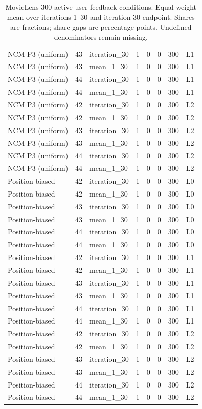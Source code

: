 \begin{table}[htbp!]
\begin{tabular}{lrlrrrrl}
NCM P3 (uniform) & 43 & iteration\_30 & 1 & 0 & 0 & 300 & L1 \\
NCM P3 (uniform) & 43 & mean\_1\_30 & 1 & 0 & 0 & 300 & L1 \\
NCM P3 (uniform) & 44 & iteration\_30 & 1 & 0 & 0 & 300 & L1 \\
NCM P3 (uniform) & 44 & mean\_1\_30 & 1 & 0 & 0 & 300 & L1 \\
NCM P3 (uniform) & 42 & iteration\_30 & 1 & 0 & 0 & 300 & L2 \\
NCM P3 (uniform) & 42 & mean\_1\_30 & 1 & 0 & 0 & 300 & L2 \\
NCM P3 (uniform) & 43 & iteration\_30 & 1 & 0 & 0 & 300 & L2 \\
NCM P3 (uniform) & 43 & mean\_1\_30 & 1 & 0 & 0 & 300 & L2 \\
NCM P3 (uniform) & 44 & iteration\_30 & 1 & 0 & 0 & 300 & L2 \\
NCM P3 (uniform) & 44 & mean\_1\_30 & 1 & 0 & 0 & 300 & L2 \\
Position-biased & 42 & iteration\_30 & 1 & 0 & 0 & 300 & L0 \\
Position-biased & 42 & mean\_1\_30 & 1 & 0 & 0 & 300 & L0 \\
Position-biased & 43 & iteration\_30 & 1 & 0 & 0 & 300 & L0 \\
Position-biased & 43 & mean\_1\_30 & 1 & 0 & 0 & 300 & L0 \\
Position-biased & 44 & iteration\_30 & 1 & 0 & 0 & 300 & L0 \\
Position-biased & 44 & mean\_1\_30 & 1 & 0 & 0 & 300 & L0 \\
Position-biased & 42 & iteration\_30 & 1 & 0 & 0 & 300 & L1 \\
Position-biased & 42 & mean\_1\_30 & 1 & 0 & 0 & 300 & L1 \\
Position-biased & 43 & iteration\_30 & 1 & 0 & 0 & 300 & L1 \\
Position-biased & 43 & mean\_1\_30 & 1 & 0 & 0 & 300 & L1 \\
Position-biased & 44 & iteration\_30 & 1 & 0 & 0 & 300 & L1 \\
Position-biased & 44 & mean\_1\_30 & 1 & 0 & 0 & 300 & L1 \\
Position-biased & 42 & iteration\_30 & 1 & 0 & 0 & 300 & L2 \\
Position-biased & 42 & mean\_1\_30 & 1 & 0 & 0 & 300 & L2 \\
Position-biased & 43 & iteration\_30 & 1 & 0 & 0 & 300 & L2 \\
Position-biased & 43 & mean\_1\_30 & 1 & 0 & 0 & 300 & L2 \\
Position-biased & 44 & iteration\_30 & 1 & 0 & 0 & 300 & L2 \\
Position-biased & 44 & mean\_1\_30 & 1 & 0 & 0 & 300 & L2 \\
\hline
\end{tabular}
\caption{MovieLens 300-active-user feedback conditions. Equal-weight mean over iterations 1--30 and iteration-30 endpoint. Shares are fractions; share gaps are percentage points. Undefined denominators remain missing.}
\label{chap:results:tab:rq1_feedback_click_behaviour}
\end{table}
